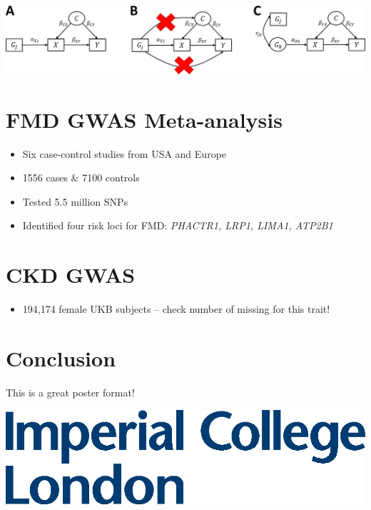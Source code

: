 \documentclass[a0paper,fleqn]{betterposter}
\begin{document}
{%
\includegraphics[width=\textwidth]{mr.png}
\cite{de2022understanding}


\section{FMD GWAS Meta-analysis \cite{georges2021genetic}}

\begin{itemize}
\item Six case-control studies from USA and Europe  
\item 1556 cases & 7100 controls  
\item Tested 5.5 million SNPs  
\item Identified four risk loci for FMD: \textit{PHACTR1, LRP1, LIMA1, ATP2B1}  
\end{itemize}


\section{CKD GWAS \cite{neale_lab_gwas}}

\begin{itemize}
\item 194,174 female UKB subjects -- check number of missing for this trait!
\end{itemize}





\section{Conclusion}
This is a great poster format!



\vfill

\includegraphics[width=\textwidth]{img/logo}\\

}
\end{document}
